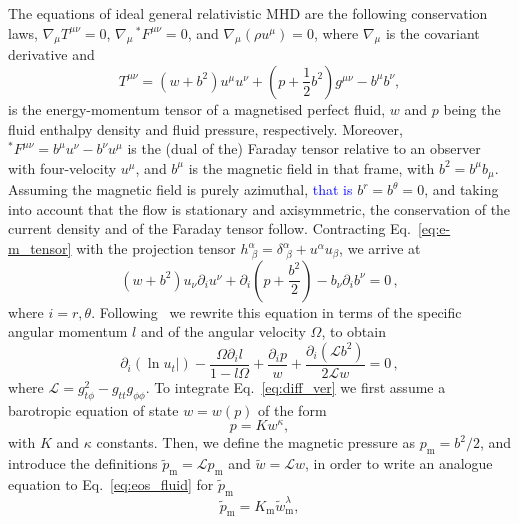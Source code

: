 \documentclass{aa}
\newcommand{\sg}[1]{\textcolor{blue}{#1}}
\begin{document}
The equations of ideal general relativistic MHD are the following conservation laws, $\nabla_{\mu} T^{\mu\nu} = 0$, $\nabla_{\mu} \,^\ast F^{\mu\nu} = 0$, and 
$\nabla_{\mu} (\rho u^{\mu}) = 0$, 
where $\nabla_{\mu}$ is the covariant derivative and
\begin{equation}\label{eq:e-m_tensor}
T^{\mu\nu} = (w + b^2)u^{\mu}u^{\nu} + \left(p + \frac{1}{2}b^2\right)g^{\mu\nu} - b^{\mu}b^{\nu},
\end{equation}
is the energy-momentum tensor of a magnetised perfect fluid, $w$ and $p$ being the fluid enthalpy density and fluid pressure, respectively. 
Moreover, $^\ast F^{\mu\nu} = b^{\mu}u^{\nu} - b^{\nu}u^{\mu}$ is the (dual of the) Faraday tensor relative to an observer with 
four-velocity $u^{\mu}$, and $b^{\mu}$ is the magnetic field in that frame, with
$b^2=b^{\mu}b_{\mu}$. Assuming the magnetic field is purely azimuthal, \sg{that is} $b^r = b^{\theta} = 0$,
and taking into account that the flow is stationary and axisymmetric, the conservation of the current density and of the Faraday tensor follow. Contracting Eq.~\eqref{eq:e-m_tensor} with the projection tensor $h^{\alpha}_{\,\,\beta} = \delta^{\alpha}_{\,\,\beta} + u^{\alpha}u_{\beta}$, we arrive at
\begin{equation}
(w + b^2)u_{\nu}\partial_i u^{\nu} + \partial_i\left(p + \frac{b^2}{2}\right) - b_{\nu}\partial_i b^{\nu}=0\,,
\end{equation}
where $i = r, \theta$. Following~\cite{Komissarov:2006} we rewrite this equation in terms of the specific angular momentum $l$ and of the angular velocity $\Omega$, to obtain
\begin{equation}\label{eq:diff_ver}
\partial_i(\ln u_t|) - \frac{\Omega \partial_i l}{1-l\Omega} + \frac{\partial_i p}{w} + \frac{\partial_i(\mathcal{L}b^2)}{2\mathcal{L}w} = 0\,,
\end{equation}
where $\mathcal{L} = g_{t\phi}^2 - g_{tt}g_{\phi\phi}$.
To integrate Eq.~\eqref{eq:diff_ver} we first assume a barotropic equation of state $w = w(p)$ of the form
\begin{equation}\label{eq:eos_fluid}
p = K w^{\kappa},
\end{equation}
with $K$ and $\kappa$ constants.
Then, we define the magnetic pressure as $p_{\mathrm{m}} = b^2/2$, and introduce the definitions $\tilde{p}_{\mathrm{m}} = \mathcal{L} p_{\mathrm{m}}$ and $\tilde{w} = \mathcal{L} w$, in order to write an analogue equation to Eq.~\eqref{eq:eos_fluid} for $\tilde{p}_{\mathrm{m}}$~\citep{Komissarov:2006}
\begin{equation}\label{eq:eos_mag_tilde}
\tilde{p}_{\mathrm{m}} = K_{\mathrm{m}} \tilde{w}_{\mathrm{m}}^{\lambda
},
\end{equation}
\end{document}
